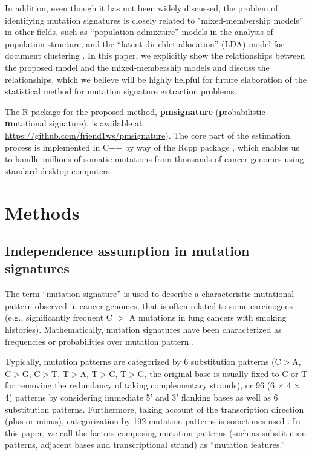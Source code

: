 In addition, even though it has not been widely discussed, 
the problem of identifying mutation signatures is closely related to "mixed-membership models'' in other fields, 
such as ``population admixture'' models \cite{pmid10835412} in the analysis of population structure, 
and the ``latent dirichlet allocation'' (LDA) model for document clustering \cite{Blei:2003}.
In this paper, we explicitly show the relationships between the proposed model and the mixed-membership models and discuss the relationships,
which we believe will be highly helpful for future elaboration of the statistical method for mutation signature extraction problems.

The R package for the proposed method,  {\bf pmsignature} ({\bf p}robabilistic {\bf m}utational signature),
is available at \url{https://github.com/friend1ws/pmsignature}).
The core part of the estimation process is implemented in C++ by way of the Rcpp package \cite{eddelbuettel2011rcpp},
which enables us to handle millions of somatic mutations from thousands of cancer genomes using standard desktop computers.





\section*{Methods}


\subsection*{Independence assumption in mutation signatures}

The term ``mutation signature'' is used to describe a characteristic mutational pattern observed in cancer genomes, 
that is often related to some carcinogens
(e.g., significantly frequent C $>$ A mutations in lung cancers with smoking histories).
Mathematically, mutation signatures have been characterized as frequencies or probabilities over mutation pattern \cite{pmid23318258,pmid23628380}. 

Typically, mutation patterns are categorized 
by 6 substitution patterns (C$>$A, C$>$G, C$>$T, T$>$A, T$>$C, T$>$G, the original base is usually fixed to C or T for removing the redundancy of taking complementary strands),
or 96 (6 $\times$ 4 $\times$ 4) patterns by considering immediate 5' and 3' flanking bases as well as 6 substitution patterns.
Furthermore, taking account of the transcription direction (plus or minus), 
categorization by 192 mutation patterns is sometimes used \cite{pmid23945592, pmid23318258}.
In this paper, we call the factors composing mutation patterns (such as substitution patterns, adjacent bases and transcriptional strand) 
as ``mutation features.''


